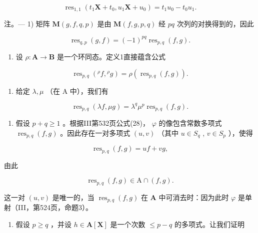 \[
\operatorname{res} _ {1, 1} \left(t _ {1} \mathbf {X} + t _ {0}, u _ {1} \mathbf {X} + u _ {0}\right) = t _ {1} u _ {0} - t _ {0} u _ {1}.
\]

注。--- 1) 矩阵 \(\mathbf{M}(g, f, q, p)\) 是由 \(\mathbf{M}(f, g, p, q)\) 经 \(pq\) 次列的对换得到的，因此

\[
\operatorname{res} _ {q, p} (g, f) = (- 1) ^ {p q} \operatorname{res} _ {p, q} (f, g).
\]

\begin{enumerate}
\def\labelenumi{\arabic{enumi})}
\setcounter{enumi}{1}
\tightlist
\item
  设 \(\rho: \mathbf{A} \to \mathbf{B}\) 是一个环同态。定义1直接蕴含公式
\end{enumerate}

\[
\operatorname{res} _ {p, q} \left({}^ {\rho} f, {}^ {\rho} g\right) = \rho \left(\operatorname{res} _ {p, q} (f, g)\right).
\]

\begin{enumerate}
\def\labelenumi{\arabic{enumi})}
\setcounter{enumi}{2}
\tightlist
\item
  给定 \(\lambda, \mu\) （在 A 中），我们有
\end{enumerate}

\[
\operatorname{res} _ {p, q} (\lambda f, \mu g) = \lambda^ {q} \mu^ {p} \operatorname{res} _ {p, q} (f, g).\tag{28}
\]

\begin{enumerate}
\def\labelenumi{\arabic{enumi})}
\setcounter{enumi}{3}
\tightlist
\item
  假设 \(p + q \geqslant 1\) 。根据III第532页公式(28)， \(\varphi\) 的像包含常数多项式 \(\operatorname{res}_{p,q}(f, g)\) 。因此存在一对多项式 \((u, v)\) （其中 \(u \in S_q\) , \(v \in S_p\) ），使得
\end{enumerate}

\[
\operatorname{res} _ {p, q} (f, g) = u f + v g,
\]

由此

\[
\operatorname{res} _ {p, q} (f, g) \in \mathrm{A} \cap (f, g).
\]

这一对 \((u, v)\) 是唯一的，当 \(\operatorname{res}_{p,q}(f, g)\) 在 \(\mathbf{A}\) 中可消去时：因为此时 \(\varphi\) 是单射（III，第524页，命题3）。

\begin{enumerate}
\def\labelenumi{\arabic{enumi})}
\setcounter{enumi}{4}
\tightlist
\item
  假设 \(p \geqslant q\) ，并设 \(h \in \mathbf{A}[\mathbf{X}]\) 是一个次数 \(\leqslant p - q\) 的多项式。让我们证明
\end{enumerate}

